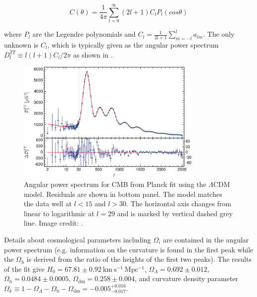 \begin{equation}
C(\theta) = \frac{1}{4 \pi} \sum\limits_{l=0}^{\infty} (2l + 1) C_{l} P_{l}(cos \theta)
\end{equation}

\noindent where $P_{l}$ are the Legendre polynomials and $C_{l} = \frac{1}{2l + 1} \sum\limits_{m=-l}^{l} a_{lm}$.  The
only unknown is $C_{l}$, which is typically given as the angular power spectrum
$D_{l}^{TT} \equiv l(l+1)C_{l}/2\pi$ as shown in .

\begin{figure}
	\includegraphics[width=0.8\textwidth]{cmb_power_spectrum}
	\centering
	\caption{Angular power spectrum for CMB from Planck fit using the $\Lambda$CDM model.  Residuals
	are shown in bottom panel.  The model matches the data well at $l < 15$ and $l > 30$.  The horizontal axis changes from linear to
	logarithmic at $l = 29$ and is marked by vertical dashed grey
	line. Image credit: .}
	\label{fig:cmb_power_spectrum}
\end{figure}

Details about cosmological parameters including $\Omega_i$ are contained in the angular power spectrum (e.g. information on the curvature
is found in the first peak while the $\Omega_{\mathrm{b}}$ is derived from the ratio of the heights of the first two peaks).  The results
of the fit give $H_{0} = 67.81 \pm 0.92\ \mathrm{km\ s^{-1}\ Mpc^{-1}}$, $\Omega_{\Lambda} = 0.692 \pm 0.012$,
$\Omega_{\mathrm{b}} = 0.0484 \pm 0.0005$, $\Omega_{\mathrm{dm}} = 0.258 \pm 0.004$, and curvature density parameter
$\Omega_{k} \equiv 1 - \Omega_{\Lambda} - \Omega_{\mathrm{b}} - \Omega_{\mathrm{dm}} =  -0.005_{-0.017}^{+0.016}$.





